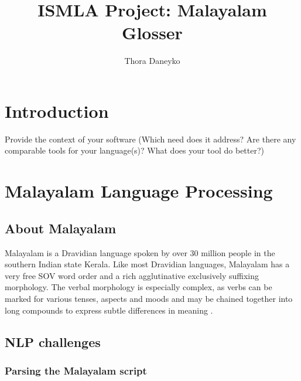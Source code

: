 \documentclass[a4paper]{article}
\author{Thora Daneyko}
\title{ISMLA Project: Malayalam Glosser}
\begin{document}
\maketitle

\begingroup
{}

\section{Introduction}

Provide the context of your software (Which need does it address? Are there any comparable tools for your language(s)? What does your tool do better?)

\section{Malayalam Language Processing}\label{malnlp}

\subsection{About Malayalam}

Malayalam is a Dravidian language spoken by over 30 million people in the southern Indian state Kerala. Like most Dravidian languages, Malayalam has a very free SOV word order and a rich agglutinative exclusively suffixing morphology. The verbal morphology is especially complex, as verbs can be marked for various tenses, aspects and moods and may be chained together into long compounds to express subtle differences in meaning \parencite{asherKumari}.

\subsection{NLP challenges}

\subsubsection{Parsing the Malayalam script}
\end{document}
